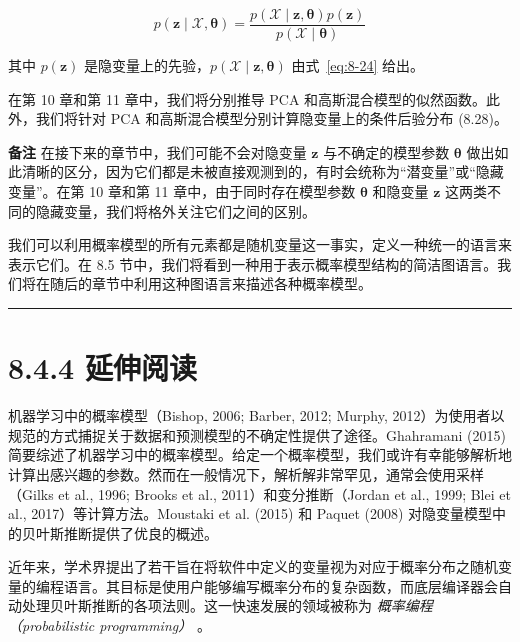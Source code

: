 \begin{equation}
p(\boldsymbol{z} \mid \mathcal{X}, \boldsymbol{\theta}) = \frac{p(\mathcal{X} \mid \boldsymbol{z}, \boldsymbol{\theta}) p(\boldsymbol{z})}{p(\mathcal{X} \mid \boldsymbol{\theta})}
\tag{8.28}\label{eq:8-28}
\end{equation}

其中 $ p(\boldsymbol{z}) $ 是隐变量上的先验，$ p(\mathcal{X} \mid \boldsymbol{z}, \boldsymbol{\theta}) $ 由式~\eqref{eq:8-24} 给出。

在第 10 章和第 11 章中，我们将分别推导 PCA 和高斯混合模型的似然函数。此外，我们将针对 PCA 和高斯混合模型分别计算隐变量上的条件后验分布 (8.28)。

\begin{notebox}
\textbf{备注} 在接下来的章节中，我们可能不会对隐变量 $ \boldsymbol{z} $ 与不确定的模型参数 $ \boldsymbol{\theta} $ 做出如此清晰的区分，因为它们都是未被直接观测到的，有时会统称为“潜变量”或“隐藏变量”。在第 10 章和第 11 章中，由于同时存在模型参数 $ \boldsymbol{\theta} $ 和隐变量 $ \boldsymbol{z} $ 这两类不同的隐藏变量，我们将格外关注它们之间的区别。
\end{notebox}

我们可以利用概率模型的所有元素都是随机变量这一事实，定义一种统一的语言来表示它们。在 8.5 节中，我们将看到一种用于表示概率模型结构的简洁图语言。我们将在随后的章节中利用这种图语言来描述各种概率模型。

\medskip\hrule\medskip

\section*{8.4.4 延伸阅读}

机器学习中的概率模型（Bishop, 2006; Barber, 2012; Murphy, 2012）为使用者以规范的方式捕捉关于数据和预测模型的不确定性提供了途径。Ghahramani (2015) 简要综述了机器学习中的概率模型。给定一个概率模型，我们或许有幸能够解析地计算出感兴趣的参数。然而在一般情况下，解析解非常罕见，通常会使用采样（Gilks et al., 1996; Brooks et al., 2011）和变分推断（Jordan et al., 1999; Blei et al., 2017）等计算方法。Moustaki et al. (2015) 和 Paquet (2008) 对隐变量模型中的贝叶斯推断提供了优良的概述。

近年来，学术界提出了若干旨在将软件中定义的变量视为对应于概率分布之随机变量的编程语言。其目标是使用户能够编写概率分布的复杂函数，而底层编译器会自动处理贝叶斯推断的各项法则。这一快速发展的领域被称为 \emph{概率编程（probabilistic programming）} 。
